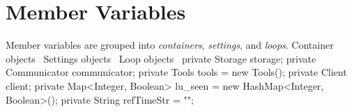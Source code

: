 \section{Member Variables}
Member variables are grouped into \emph{containers}, \emph{settings}, and
\emph{loops}.
\nwenddocs{}\endmoddef{}
\LA{}Container objects~{\nwtagstyle{}}\RA{}
\LA{}Settings objects~{\nwtagstyle{}}\RA{}
\LA{}Loop objects~{\nwtagstyle{}}\RA{}
\nwendcode{}\nwdocspar
{}
\nwenddocs{}\endmoddef{}
private Storage storage;
private Communicator communicator;
private Tools tools = new Tools();
private Client client;
private Map<Integer, Boolean> lu_seen = new HashMap<Integer, Boolean>();
private String refTimeStr = "";
\nwendcode{}\nwdocspar

